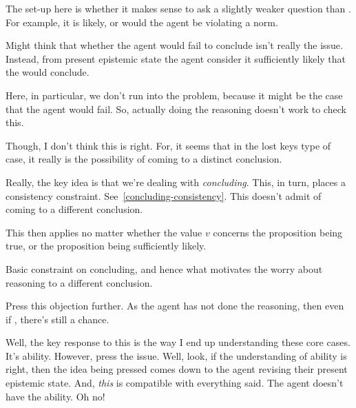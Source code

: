 \begin{note}
  The set-up here is whether it makes sense to ask a slightly weaker question than \qzS{}.
  For example, it is likely, or would the agent be violating a norm.
\end{note}

\begin{note}
  Might think that whether the agent would fail to conclude isn't really the issue.
  Instead, from present epistemic state the agent consider it sufficiently likely that the would conclude.

  Here, in particular, we don't run into the \requ{} problem, because it might be the case that the agent would fail.
  So, actually doing the reasoning doesn't work to check this.

  Though, I don't think this is right.
  For, it seems that in the lost keys type of case, it really is the possibility of coming to a distinct conclusion.

  Really, the key idea is that we're dealing with \emph{concluding}.
  This, in turn, places a consistency constraint.
  See~\autoref{concluding-consistency}.
  This doesn't admit of coming to a different conclusion.

  This then applies no matter whether the value \(v\) concerns the proposition being true, or the proposition being sufficiently likely.

  Basic constraint on concluding, and hence what motivates the worry about reasoning to a different conclusion.
\end{note}

\begin{note}
  Press this objection further.
  As the agent has not done the reasoning, then even if , there's still a chance.

  Well, the key response to this is the way I end up understanding these core cases.
  It's ability.
  However, press the issue.
  Well, look, if the understanding of ability is right, then the idea being pressed comes down to the agent revising their present epistemic state.
  And, \emph{this} is compatible with everything said.
  The agent doesn't have the ability.
  Oh no!
\end{note}

